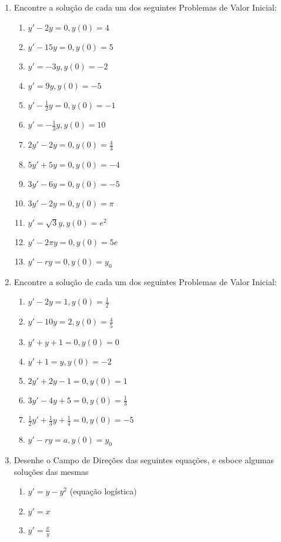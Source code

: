 \documentclass[a4paper]{article}
\begin{document}
\begin{enumerate}
\item Encontre a solução de cada um dos seguintes Problemas de Valor
  Inicial:

  \begin{enumerate}
  \item $y' -2y = 0, y(0)=4$
  \item $y' -15y = 0, y(0)=5$
  \item $y' = -3y, y(0)=-2$
  \item $y' = 9y, y(0)=-5$
  \item $y' - \frac{1}{2} y = 0, y(0)=-1$
  \item $y' = -\frac{1}{3} y, y(0)=10$
  \item $2y' - 2y = 0, y(0)=\frac{4}{3}$
  \item $5y' +5y =0, y(0)=-4$
  \item $3y' -6y = 0, y(0)=-5$
  \item $3y' -2y =0, y(0)=\pi$
  \item $y' = \sqrt{3}y, y(0)=e^2$
  \item $y' -2\pi y =0, y(0)=5e$
  \item $y' - ry = 0, y(0)=y_0$
  \end{enumerate}


\item Encontre a solução de cada um dos seguintes Problemas de Valor
  Inicial:

  \begin{enumerate}
  \item $y' - 2y = 1, y(0)=\frac{1}{2}$
  \item $y' - 10y = 2, y(0)=\frac{4}{5}$
  \item $y' + y + 1 = 0, y(0)=0$
  \item $y' + 1 = y, y(0)=-2$
  \item $2y' + 2y -1 = 0, y(0)=1$
  \item $3y'- 4y +5 = 0, y(0)=\frac{1}{3}$
  \item $\frac{1}{2} y' + \frac{1}{3} y + \frac{1}{4} = 0, y(0)=-5$
  \item $y' -ry = a, y(0)=y_0$
  \end{enumerate}

\item Desenhe o Campo de Direções das seguintes equações, e esboce
  algumas soluções das mesmas

  \begin{enumerate}
  \item $y' = y-y^2$ (equação logística)
  \item $y' = x$
  \item $y' = \frac{x}{y}$
  \end{enumerate}
\end{enumerate}
\end{document}
